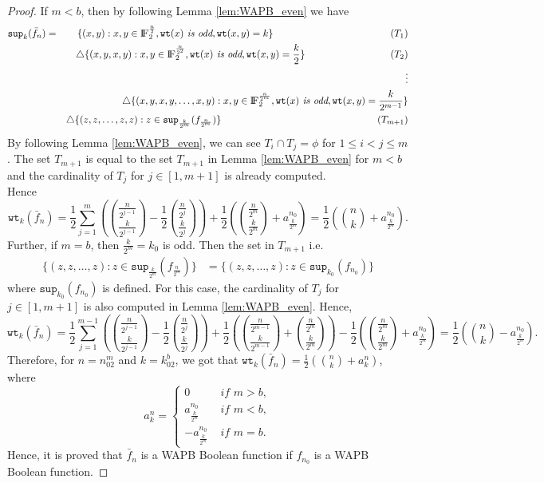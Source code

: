 \documentclass{article}[12pt]
\newcommand{\FF}{{\rm I\!F}}
\newcommand{\wt}{\mathtt{wt}}
\newcommand{\spt}{\mathtt{sup}}
\begin{document}
\begin{proof}
If $m < b$, then by following Lemma \ref{lem:WAPB_even} we have
\begin{eqnarray*}
	\spt_k(\bar{f}_n) & = &\{(x,y) : x,y \in \FF_2^{\frac{n}{2}}, \wt(x) \textit{ is odd}, \wt(x,y) = k\} \hspace{1.65in} (T_1)\\
	 & &\triangle \{(x,y,x,y) : x,y \in \FF_2^{\frac{n}{2^2}}, \wt(x) \textit{ is odd},  \wt(x,y) = \frac{k}{2}\} \hspace{1.2in}(T_2)\\ 
	& & \vdots \\
	& &\triangle \{(x,y,x,y, \ldots,x,y) : x,y \in \FF_2^{\frac{n}{2^m}}, \wt(x) \textit{ is odd},  \wt(x,y) = \frac{k}{2^{m-1}}\}  \\
	& & \triangle \{(z,z,\ldots, z,z) : z \in \spt_\frac{k}{2^m}(f_{\frac{n}{2^m}})\} \hspace{2.2in}(T_{m+1})
\end{eqnarray*}
By following Lemma \ref{lem:WAPB_even}, we can see $T_i \cap T_j = \phi$ for $1 \leq i < j \leq m$.  The set $T_{m+1}$ is equal to the set $T_{m+1}$ in Lemma \ref{lem:WAPB_even} for $m < b$ and the cardinality of $T_{j}$ for $j \in [1,m+1]$ is already computed. \\
Hence $$\displaystyle{\wt_k(\bar{f}_n) = \frac{1}{2} \sum_{j=1}^m\left({\frac{n}{2^{j-1}} \choose \frac{k}{2^{j-1}}} - \frac{1}{2}{\frac{n}{2^j} \choose \frac{k}{2^j}}\right) + \frac{1}{2}\left({\frac{n}{2^m} \choose \frac{k}{2^m}} + a_\frac{k}{2^m}^{n_0}\right) = \frac{1}{2}\left({n \choose k} + a_\frac{k}{2^m}^{n_0}\right) }.$$
Further, if $m =b$, then $\frac{k}{2^m}= k_0$ is odd. Then the set in $T_{m+1} $ i.e.
\begin{align*}
\{(z,z,\ldots,z): z \in \spt_{\frac{k}{2^m}}(f_{\frac{n}{2^m}})\} & = \{(z,z,\ldots,z): z \in \spt_{k_0}(f_{n_0})\}
\end{align*}
 where $\spt_{k_0}(f_{n_0})$ is defined. For this case, the cardinality of $T_{j}$ for $j \in [1,m+1]$ is also computed in Lemma \ref{lem:WAPB_even}.
  Hence, $$\displaystyle{\wt_k(\bar{f}_n) = \frac{1}{2} \sum_{j=1}^{m-1}\left({\frac{n}{2^{j-1}} \choose \frac{k}{2^{j-1}}} - \frac{1}{2}{\frac{n}{2^j} \choose \frac{k}{2^j}}\right) + \frac{1}{2}\left(
 	{\frac{n}{2^{m-1}} \choose \frac{k}{2^{m-1}}} + {\frac{n}{2^m} \choose \frac{k}{2^m}}\right) - \frac{1}{2}\left({\frac{n}{2^m} \choose \frac{k}{2^m}} + a_\frac{k}{2^m}^{n_0}\right) = \frac{1}{2}\left({n \choose k} - a_\frac{k}{2^m}^{n_0}\right) }.$$
 Therefore, for $n = n_02^m$ and $k = k_02^b$, we got that $\wt_k(\bar{f}_n) = \frac{1}{2}\left({n \choose k} + a_k^n\right)$, where
 $$a_k^n = 
 \begin{cases}
 0 & \textit{ if } m > b, \\
 a_\frac{k}{2^m}^{n_0} & \textit{ if } m < b, \\
 - a_\frac{k}{2^m}^{n_0} & \textit{ if } m = b.
 \end{cases}$$
 Hence, it is proved that $\bar{f}_n$ is a WAPB Boolean function if $f_{n_0}$ is a WAPB Boolean function.
 
\end{proof}
\end{document}
